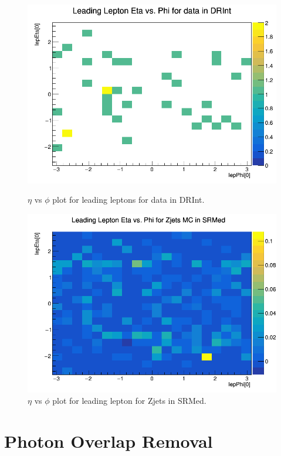 \begin{figure}[htbp]
\centering
\begin{minipage}{0.45\textwidth}
    \includegraphics[width=\textwidth]{Images/SUSY/lep_eta_phi_data_DRInt.png}
    \caption{$\eta$ vs $\phi$ plot for leading leptons for data in DRInt.}
\end{minipage}
\hfill
\begin{minipage}{0.45\textwidth}
    \includegraphics[width=\textwidth]{Images/SUSY/lep_eta_phi_Zjets_SRMed.png}
    \caption{$\eta$ vs $\phi$ plot for leading lepton for Zjets in SRMed.}
    \label{fig:MC_angle_validation_last}
\end{minipage}
\end{figure}

\section{Photon Overlap Removal}

